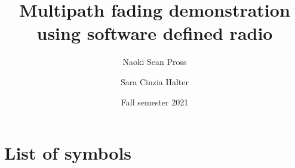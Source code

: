 \documentclass[
	overfullrule,
	paper = a4, twoside, openright, BCOR = 5mm,
	headinclude, footexclude,
	fontsize = 11pt,
	cleardoublepage = empty,
	titlepage, abstract = on,
	automark,
]{scrreprt}
\title{Multipath fading demonstration using software defined radio}
\author{Naoki Sean Pross \and Sara Cinzia Halter}
\date{Fall semester 2021}
\begin{document}
	\hypersetup{pageanchor = false}

	\maketitle

	\cleardoublepage
	\setcounter{page}{1}

	\begin{abstract}
		\skelpar
	\end{abstract}

	\tableofcontents
	\cleardoublepage

	\chapter*{List of symbols}
	\noindent %
\end{document}
